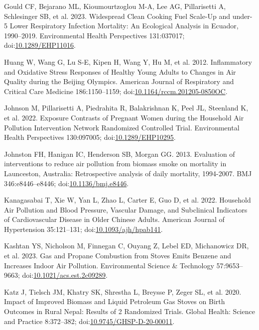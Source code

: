 \documentclass[
  letterpaper,
  DIV=11,
  numbers=noendperiod]{scrartcl}
\newlength{\cslhangindent}
\newenvironment{CSLReferences}[2] %
 {\begin{list}{}{%
  \setlength{\itemindent}{0pt}
  \setlength{\leftmargin}{0pt}
  \setlength{\parsep}{0pt}
  \ifodd #1
   \setlength{\leftmargin}{\cslhangindent}
   \setlength{\itemindent}{-1\cslhangindent}
  \fi
  \setlength{\itemsep}{#2\baselineskip}}}
 {\end{list}}
\begin{document}
\begin{CSLReferences}{1}{1}
Gould CF, Bejarano ML, Kioumourtzoglou M-A, Lee AG, Pillarisetti A,
Schlesinger SB, et al. 2023. Widespread {Clean Cooking Fuel Scale-Up}
and under-5 {Lower Respiratory Infection Mortality}: {An Ecological
Analysis} in {Ecuador}, 1990--2019. Environmental Health Perspectives
131:037017;
doi:\href{https://doi.org/10.1289/EHP11016}{10.1289/EHP11016}.

Huang W, Wang G, Lu S-E, Kipen H, Wang Y, Hu M, et al. 2012.
Inflammatory and {Oxidative Stress Responses} of {Healthy Young Adults}
to {Changes} in {Air Quality} during the {Beijing Olympics}. American
Journal of Respiratory and Critical Care Medicine 186:1150--1159;
doi:\href{https://doi.org/10.1164/rccm.201205-0850OC}{10.1164/rccm.201205-0850OC}.

Johnson M, Pillarisetti A, Piedrahita R, Balakrishnan K, Peel JL,
Steenland K, et al. 2022. Exposure {Contrasts} of {Pregnant Women}
during the {Household Air Pollution Intervention Network Randomized
Controlled Trial}. Environmental Health Perspectives 130:097005;
doi:\href{https://doi.org/10.1289/EHP10295}{10.1289/EHP10295}.

Johnston FH, Hanigan IC, Henderson SB, Morgan GG. 2013. Evaluation of
interventions to reduce air pollution from biomass smoke on mortality in
{Launceston}, {Australia}: Retrospective analysis of daily mortality,
1994-2007. BMJ 346:e8446--e8446;
doi:\href{https://doi.org/10.1136/bmj.e8446}{10.1136/bmj.e8446}.

Kanagasabai T, Xie W, Yan L, Zhao L, Carter E, Guo D, et al. 2022.
Household {Air Pollution} and {Blood Pressure}, {Vascular Damage}, and
{Subclinical Indicators} of {Cardiovascular Disease} in {Older Chinese
Adults}. American Journal of Hypertension 35:121--131;
doi:\href{https://doi.org/10.1093/ajh/hpab141}{10.1093/ajh/hpab141}.

Kashtan YS, Nicholson M, Finnegan C, Ouyang Z, Lebel ED, Michanowicz DR,
et al. 2023. Gas and {Propane Combustion} from {Stoves Emits Benzene}
and {Increases Indoor Air Pollution}. Environmental Science \&
Technology 57:9653--9663;
doi:\href{https://doi.org/10.1021/acs.est.2c09289}{10.1021/acs.est.2c09289}.

Katz J, Tielsch JM, Khatry SK, Shrestha L, Breysse P, Zeger SL, et al.
2020. Impact of {Improved Biomass} and {Liquid Petroleum Gas Stoves} on
{Birth Outcomes} in {Rural Nepal}: {Results} of 2 {Randomized Trials}.
Global Health: Science and Practice 8:372--382;
doi:\href{https://doi.org/10.9745/GHSP-D-20-00011}{10.9745/GHSP-D-20-00011}.


\end{CSLReferences}
\end{document}
